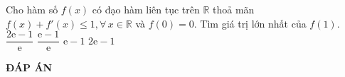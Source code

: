 \begin{ex}%
Cho hàm số $ f(x) $ có đạo hàm liên tục trên $ \mathbb{R} $ thoả mãn $ f(x) + f'(x) \leq 1, \forall \, x \in \mathbb{R} $ và $ f(0) = 0 $. Tìm giá trị lớn nhất của $ f(1) $.	
	\choice
	{$ \dfrac{2 \mathrm{e} - 1 }{\mathrm{e}} $}
	{\True $ \dfrac{\mathrm{e} - 1}{\mathrm{e}} $}
	{$ \mathrm{e} - 1 $}
	{$ 2\mathrm{e} -1 $}
\end{ex}
\newpage
\begin{center}
\textbf{ĐÁP ÁN}
\end{center}
\begin{multicols}{5}
 
\end{multicols}